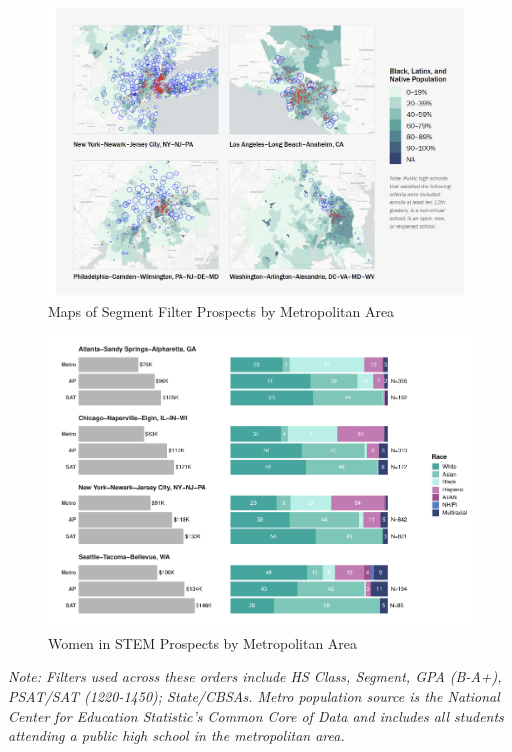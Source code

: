 \documentclass[
  12pt,
]{article}
\begin{document}
\pagebreak

\begin{landscape}

\begin{figure}

{\centering \includegraphics[width=1\linewidth]{./../../outputs/images/uiuc-map} 

}

\caption{Maps of Segment Filter Prospects by Metropolitan Area}\label{fig:uiuc-map}
\end{figure}

\end{landscape}

\pagebreak

\clearpage

\begin{figure}
\centering
\includegraphics{eepa_student_list_manuscript_c_a_files/figure-latex/ucsd-deep-dive-1.pdf}
\caption{\label{fig:ucsd-deep-dive}Women in STEM Prospects by Metropolitan Area}
\end{figure}

\begingroup
\fontsize{10}{10}\selectfont

\emph{Note: Filters used across these orders include HS Class, Segment, GPA (B-A+), PSAT/SAT (1220-1450); State/CBSAs. Metro population source is the National Center for Education Statistic's Common Core of Data and includes all students attending a public high school in the metropolitan area. }
\endgroup
\end{document}
